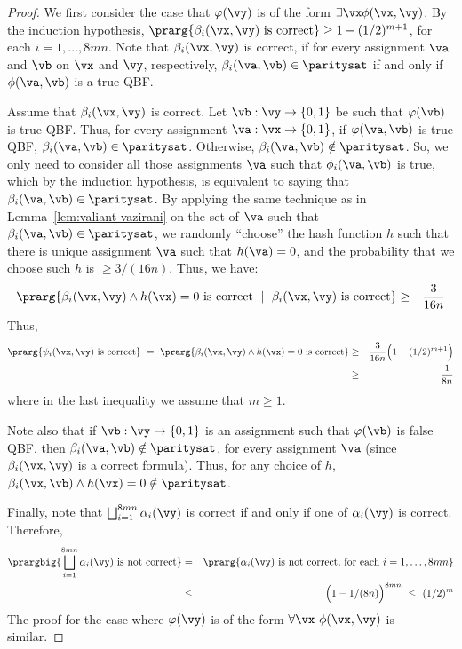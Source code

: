 \documentclass[11pt, a4paper]{article}
\begin{document}
\begin{proof}
We first consider the case that $\varphi(\vy)$ is of the form $\exists\vx \phi(\vx,\vy)$.
By the induction hypothesis, $\prarg {\beta_i(\vx,\vy) \ \text{is correct}} \geq 1-(1/2)^{m+1}$,
for each $i=1,\ldots,8mn$.
Note that $\beta_i(\vx,\vy)$ is correct, if for every assignment $\va$ and $\vb$ on $\vx$ and $\vy$, respectively,
$\beta_{i}(\va,\vb)\in \paritysat$ if and only if $\phi(\va,\vb)$ is a true QBF.

Assume that $\beta_i(\vx,\vy)$ is correct.
Let $\vb:\vy\to\{0,1\}$ be such that $\varphi(\vb)$ is true QBF.
Thus, for every assignment $\va:\vx\to\{0,1\}$,
if $\varphi(\va,\vb)$ is true QBF, $\beta_i(\va,\vb) \in \paritysat$.
Otherwise, $\beta_i(\va,\vb)\notin \paritysat$.
So, we only need to consider all those assignments $\va$ such that $\phi_i(\va,\vb)$ is true,
which by the induction hypothesis, is equivalent to saying that $\beta_i(\va,\vb)\in \paritysat$.
By applying the same technique as in Lemma~\ref{lem:valiant-vazirani} on the set of $\va$ such that $\beta_i(\va,\vb)\in \paritysat$,
we randomly ``choose'' the hash function $h$ such that there is unique assignment $\va$ such that $h(\va)=0$,
and the probability that we choose such $h$ is $\geq 3/(16n)$.
Thus, we have:
\begin{eqnarray*}
\prarg {\beta_i(\vx,\vy)\wedge h(\vx)=0 \ \text{is correct}\ \mid\ \beta_i(\vx,\vy) \ \text{is correct}}
& \geq & \frac{3}{16n}
\end{eqnarray*}
Thus,
\begin{eqnarray*}
\prarg {\psi_i(\vx,\vy) \ \text{is correct}} \ = \
\prarg {\beta_i(\vx,\vy)\wedge h(\vx)=0 \ \text{is correct}}
& \geq & \frac{3}{16n}\Big(1 - (1/2)^{m+1}\Big) 
\\
& \geq&  \frac{1}{8n}
\end{eqnarray*}
where in the last inequality we assume that $m\geq 1$.

Note also that if $\vb:\vy\to\{0,1\}$ is an assignment such that $\varphi(\vb)$ is false QBF,
then $\beta_i(\va,\vb) \notin \paritysat$, for every assignment $\va$ (since $\beta_i(\vx,\vy)$ is a correct formula).
Thus, for any choice of $h$, $\beta_i(\vx,\vb) \wedge h(\vx)=0 \notin \paritysat$.

Finally, note that $\bigsqcup_{i=1}^{8mn} \alpha_i(\vy)$ is correct if and only if one of $\alpha_i(\vy)$ is correct.
Therefore,
\begin{eqnarray*}
\prargbig {\bigsqcup_{i=1}^{8mn} \alpha_i(\vy) \ \text{is not correct}}
& = & \prarg {\alpha_i(\vy) \ \text{is not correct, for each}\ i=1,\ldots,8mn} 
\\
& \leq &
\Big(1- 1/(8n)\Big)^{8mn}
\ \leq \ (1/2)^m
\end{eqnarray*}
The proof for the case where $\varphi(\vy)$ is of the form $\forall\vx\ \phi(\vx,\vy)$ is similar.
\end{proof}
\end{document}
